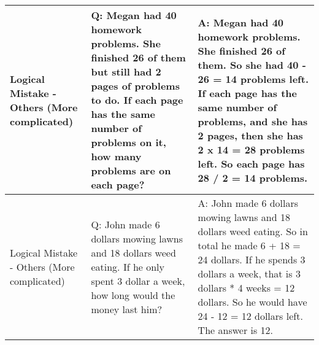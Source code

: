 \begin{center}
\begin{longtable}{|p{}|p{}|p{}|}
\midrule

Logical Mistake - Others (More complicated) &Q: Megan had 40 homework problems. She finished 26 of them but still had 2 pages of problems to do. If each page has the same number of problems on it, how many problems are on each page? &A: Megan had 40 homework problems. She finished 26 of them. So she had 40 - 26 = 14 problems left. If each page has the same number of problems, and she has 2 pages, then she has 2 x 14 = 28 problems left. So each page has 28 / 2 = 14 problems. \\

\midrule

Logical Mistake - Others (More complicated) &Q: John made 6 dollars mowing lawns and 18 dollars weed eating. If he only spent 3 dollar a week, how long would the money last him? &A: John made 6 dollars mowing lawns and 18 dollars weed eating. So in total he made 6 + 18 = 24 dollars. If he spends 3 dollars a week, that is 3 dollars * 4 weeks = 12 dollars. So he would have 24 - 12 = 12 dollars left. The answer is 12. \\

\bottomrule

\end{longtable}
\end{center}